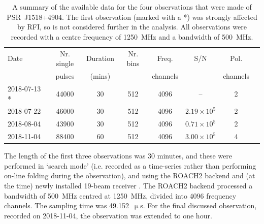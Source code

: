 \begin{table}
    \centering
    \caption[PSR~J1518+4904 available data summary]{A summary of the available data for the four observations that were made of PSR~J1518+4904. The first observation (marked with a *) was strongly affected by RFI, so is not considered further in the analysis. All observations were recorded with a centre frequency of 1250~MHz and a bandwidth of 500~MHz. }
    \label{tab: J1518 - observation summary}
    \begin{tabular}{lccccccc}
        \hline
        Date & Nr. single & Duration & Nr. bins & Freq. & S/N & Pol.\\
         & pulses & (mins) & & channels & & channels\\
        
        \hline
        2018-07-13 * & 44000 & 30 & 512 & 4096 & --& 2\\ 
        2018-07-22 & 46000 & 30 & 512 & 4096 & $2.19\times10^5$ & 2\\
        2018-08-04 & 43900 & 30 & 512 & 4096 & $0.71\times10^5$ & 2\\
        2018-11-04 & 88400 & 60 & 512 & 4096 & $3.00\times10^5$ & 4
    \end{tabular}
\end{table}

The length of the first three observations was 30 minutes, and these were performed in `search mode' (i.e. recorded as a time-series rather than performing on-line folding during the observation), and using the ROACH2 backend and (at the time) newly installed 19-beam receiver \citep[e.g][]{JYG+2019}. The ROACH2 backend processed a bandwidth of 500~MHz centred at 1250~MHz, divided into 4096 frequency channels. The sampling time was 49.152~$\upmu$s. For the final discussed observation, recorded on 2018-11-04, the observation was extended to one hour. 

